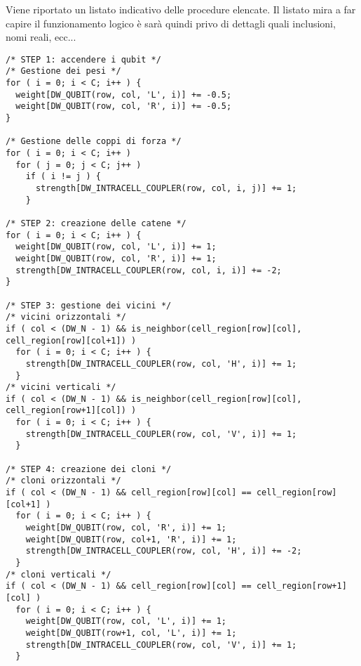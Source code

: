 Viene riportato un listato indicativo delle procedure elencate. Il listato mira a far capire il funzionamento logico è sarà quindi privo di dettagli quali inclusioni, nomi reali, ecc...
\lstset{language=C}
\begin{lstlisting}
/* STEP 1: accendere i qubit */
/* Gestione dei pesi */
for ( i = 0; i < C; i++ ) {
  weight[DW_QUBIT(row, col, 'L', i)] += -0.5;
  weight[DW_QUBIT(row, col, 'R', i)] += -0.5;
}

/* Gestione delle coppi di forza */
for ( i = 0; i < C; i++ )
  for ( j = 0; j < C; j++ )
    if ( i != j ) {
      strength[DW_INTRACELL_COUPLER(row, col, i, j)] += 1;
    }

/* STEP 2: creazione delle catene */
for ( i = 0; i < C; i++ ) {
  weight[DW_QUBIT(row, col, 'L', i)] += 1;
  weight[DW_QUBIT(row, col, 'R', i)] += 1;
  strength[DW_INTRACELL_COUPLER(row, col, i, i)] += -2;
}

/* STEP 3: gestione dei vicini */
/* vicini orizzontali */
if ( col < (DW_N - 1) && is_neighbor(cell_region[row][col], cell_region[row][col+1]) )
  for ( i = 0; i < C; i++ ) {
    strength[DW_INTRACELL_COUPLER(row, col, 'H', i)] += 1;
  }
/* vicini verticali */
if ( col < (DW_N - 1) && is_neighbor(cell_region[row][col], cell_region[row+1][col]) )
  for ( i = 0; i < C; i++ ) {
    strength[DW_INTRACELL_COUPLER(row, col, 'V', i)] += 1;
  }

/* STEP 4: creazione dei cloni */
/* cloni orizzontali */
if ( col < (DW_N - 1) && cell_region[row][col] == cell_region[row][col+1] )
  for ( i = 0; i < C; i++ ) {
    weight[DW_QUBIT(row, col, 'R', i)] += 1;
    weight[DW_QUBIT(row, col+1, 'R', i)] += 1;
    strength[DW_INTRACELL_COUPLER(row, col, 'H', i)] += -2;
  }
/* cloni verticali */
if ( col < (DW_N - 1) && cell_region[row][col] == cell_region[row+1][col] )
  for ( i = 0; i < C; i++ ) {
    weight[DW_QUBIT(row, col, 'L', i)] += 1;
    weight[DW_QUBIT(row+1, col, 'L', i)] += 1;
    strength[DW_INTRACELL_COUPLER(row, col, 'V', i)] += 1;
  }
\end{lstlisting}
